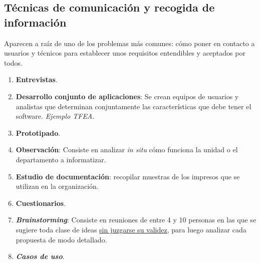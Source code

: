 \subsection{Técnicas de comunicación y recogida de información}
Aparecen a raíz de uno de los problemas más comunes: cómo poner en contacto a usuarios y técnicos para establecer unos requisitos entendibles y aceptados por todos.
\begin{enumerate}
    \item \textbf{Entrevistas}.
    \item \textbf{Desarrollo conjunto de aplicaciones}: Se crean equipos de usuarios y analistas que determinan conjuntamente las características que debe tener el software. \textit{Ejemplo TFEA}.
    \item \textbf{Prototipado}.
    \item \textbf{Observación}: Consiste en analizar \textit{in situ} cómo funciona la unidad o el departamento a informatizar.
    \item \textbf{Estudio de documentación}: recopilar muestras de los impresos que se utilizan en la organización.
    \item \textbf{Cuestionarios}.
    \item \textit{\textbf{Brainstorming}}: Consiste en reuniones de entre 4 y 10 personas en las que se sugiere toda clase de ideas \uline{sin juzgarse su validez}, para luego analizar cada propuesta de modo detallado.
    \item \textit{\textbf{Casos de uso}}.
\end{enumerate}

